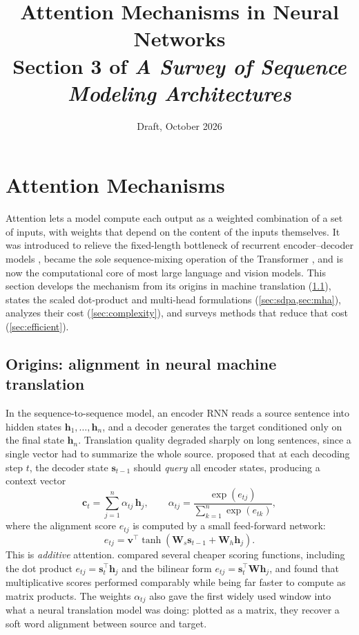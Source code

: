 \documentclass[11pt]{article}
\title{Attention Mechanisms in Neural Networks\\[0.3em]
  \large Section 3 of \emph{A Survey of Sequence Modeling Architectures}}
\author{}
\date{Draft, October 2026}
\newcommand{\mW}{\mathbf{W}}
\begin{document}
\maketitle

\setcounter{section}{2}

\section{Attention Mechanisms}
\label{sec:attention}

Attention lets a model compute each output as a weighted combination of a set of inputs, with weights that depend on the content of the inputs themselves. It was introduced to relieve the fixed-length bottleneck of recurrent encoder--decoder models \citep{bahdanau2015neural}, became the sole sequence-mixing operation of the Transformer \citep{vaswani2017attention}, and is now the computational core of most large language and vision models. This section develops the mechanism from its origins in machine translation (\cref{sec:origins}), states the scaled dot-product and multi-head formulations (\cref{sec:sdpa,sec:mha}), analyzes their cost (\cref{sec:complexity}), and surveys methods that reduce that cost (\cref{sec:efficient}).

\subsection{Origins: alignment in neural machine translation}
\label{sec:origins}

In the sequence-to-sequence model, an encoder RNN reads a source sentence into hidden states $\bm{h}_1, \dots, \bm{h}_n$, and a decoder generates the target conditioned only on the final state $\bm{h}_n$. Translation quality degraded sharply on long sentences, since a single vector had to summarize the whole source. \citet{bahdanau2015neural} proposed that at each decoding step $t$, the decoder state $\bm{s}_{t-1}$ should \emph{query} all encoder states, producing a context vector
\begin{equation}
  \bm{c}_t = \sum_{j=1}^{n} \alpha_{tj}\, \bm{h}_j,
  \qquad
  \alpha_{tj} = \frac{\exp(e_{tj})}{\sum_{k=1}^{n} \exp(e_{tk})},
  \label{eq:context}
\end{equation}
where the alignment score $e_{tj}$ is computed by a small feed-forward network:
\begin{equation}
  e_{tj} = \bm{v}^\top \tanh\left( \mW_s \bm{s}_{t-1} + \mW_h \bm{h}_j \right).
  \label{eq:additive}
\end{equation}
This is \emph{additive} attention. \citet{luong2015effective} compared several cheaper scoring functions, including the dot product $e_{tj} = \bm{s}_t^\top \bm{h}_j$ and the bilinear form $e_{tj} = \bm{s}_t^\top \mW \bm{h}_j$, and found that multiplicative scores performed comparably while being far faster to compute as matrix products. The weights $\alpha_{tj}$ also gave the first widely used window into what a neural translation model was doing: plotted as a matrix, they recover a soft word alignment between source and target.
\end{document}
